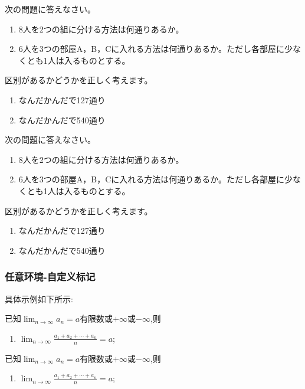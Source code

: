 \begin{tcblisting}{}
\begin{reidai}
    次の問題に答えなさい。
    \begin{enumerate}
        \item 8人を2つの組に分ける方法は何通りあるか。
        \item 6人を3つの部屋A，B，Cに入れる方法は何通りあるか。ただし各部屋に少なくとも1人は入るものとする。
    \end{enumerate}
    \tcblower
    区別があるかどうかを正しく考えます。
    \begin{enumerate}
        \item なんだかんだで127通り
        \item なんだかんだで540通り
    \end{enumerate}
\end{reidai}
\end{tcblisting}

\begin{reidai}
次の問題に答えなさい。
\begin{enumerate}
    \item 8人を2つの組に分ける方法は何通りあるか。
    \item 6人を3つの部屋A，B，Cに入れる方法は何通りあるか。ただし各部屋に少なくとも1人は入るものとする。
\end{enumerate}
\tcblower
区別があるかどうかを正しく考えます。
\begin{enumerate}
    \item なんだかんだで127通り
    \item なんだかんだで540通り
\end{enumerate}
\end{reidai}


\subsubsection{任意环境-自定义标记}
具体示例如下所示:
\begin{anymark}[总结~证明极限存在性常用二法]
    已知$\lim_{n\to\infty}a_n=a$\;有限数或$+\infty$或$-\infty$,则
    \begin{enumerate}
        \item $\lim_{n\to\infty}\frac{a_1+a_2+\cdots+a_n}{n}=a$;
    \end{enumerate}
\end{anymark}
\begin{tcblisting}{}
\begin{anymark}[总结~证明极限存在性常用二法]
已知$\lim_{n\to\infty}a_n=a$\;有限数或$+\infty$或$-\infty$,则
\begin{enumerate}
    \item $\lim_{n\to\infty}\frac{a_1+a_2+\cdots+a_n}{n}=a$;
\end{enumerate}
\end{anymark}
\end{tcblisting}

